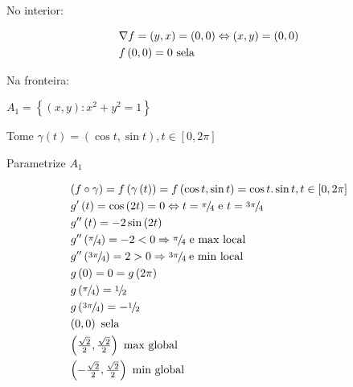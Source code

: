 \documentclass{book}
\begin{document}
\begin{sol}
No interior:

\[
\begin{gathered}
      \nabla f = \left( {y,x} \right) = \left( {0,0} \right) \Leftrightarrow \left( {x,y} \right) = \left( {0,0} \right) \hfill \\
f\left( {0,0} \right) = 0{\text{ sela}} \hfill \\
\end{gathered}
\]

Na fronteira:

$A_1  = \left\{ {\left( {x,y} \right):x^2  + y^2  = 1} \right\}$

    Tome $\gamma \left( t \right) = \left( {\cos t,\sin t} \right),t \in \left[ {0,2\pi } \right]$

Parametrize $A_1$

\[
\begin{gathered}
  \left( {f \circ \gamma } \right) = f\left( {\gamma \left( t \right)} \right) = f\left( {\cos t,\sin t} \right) = \cos t.\sin t,t \in \left[ {0,2\pi } \right] \hfill \\
  g'\left( t \right) = \cos \left( {2t} \right) = 0 \Leftrightarrow t = {\raise0.5ex\hbox{$\scriptstyle \pi $}
\kern-0.1em/\kern-0.15em
\lower0.25ex\hbox{$\scriptstyle 4$}}{\text{ e }}t = {\raise0.5ex\hbox{$\scriptstyle {3\pi }$}
\kern-0.1em/\kern-0.15em
\lower0.25ex\hbox{$\scriptstyle 4$}} \hfill \\
g''\left( t \right) =  - 2\sin \left( {2t} \right) \hfill \\
g''\left( {{\raise0.5ex\hbox{$\scriptstyle \pi $}
\kern-0.1em/\kern-0.15em
\lower0.25ex\hbox{$\scriptstyle 4$}}} \right) =  - 2 < 0 \Rightarrow {\raise0.5ex\hbox{$\scriptstyle \pi $}
\kern-0.1em/\kern-0.15em
\lower0.25ex\hbox{$\scriptstyle 4$}}{\text{ e max local}} \hfill \\
g''\left( {{\raise0.5ex\hbox{$\scriptstyle {3\pi }$}
\kern-0.1em/\kern-0.15em
\lower0.25ex\hbox{$\scriptstyle 4$}}} \right) = 2 > 0 \Rightarrow {\raise0.5ex\hbox{$\scriptstyle {3\pi }$}
\kern-0.1em/\kern-0.15em
\lower0.25ex\hbox{$\scriptstyle 4$}}\;{\text{e min local}} \hfill \\
g\left( 0 \right) = 0 = g\left( {2\pi } \right) \hfill \\
g\left( {{\raise0.5ex\hbox{$\scriptstyle \pi $}
\kern-0.1em/\kern-0.15em
\lower0.25ex\hbox{$\scriptstyle 4$}}} \right) = {\raise0.5ex\hbox{$\scriptstyle 1$}
\kern-0.1em/\kern-0.15em
\lower0.25ex\hbox{$\scriptstyle 2$}} \hfill \\
g\left( {{\raise0.5ex\hbox{$\scriptstyle {3\pi }$}
\kern-0.1em/\kern-0.15em
\lower0.25ex\hbox{$\scriptstyle 4$}}} \right) =  - {\raise0.5ex\hbox{$\scriptstyle 1$}
\kern-0.1em/\kern-0.15em
\lower0.25ex\hbox{$\scriptstyle 2$}} \hfill \\
\left( {0,0} \right){\text{ sela}} \hfill \\
\left( {\tfrac{{\sqrt 2 }}
{2},\tfrac{{\sqrt 2 }}
{2}} \right){\text{ max global}} \hfill \\
\left( { - \tfrac{{\sqrt 2 }}
{2},\tfrac{{\sqrt 2 }}
{2}} \right){\text{ min global}} \hfill \\
\end{gathered}
\]


\end{sol}
\end{document}

